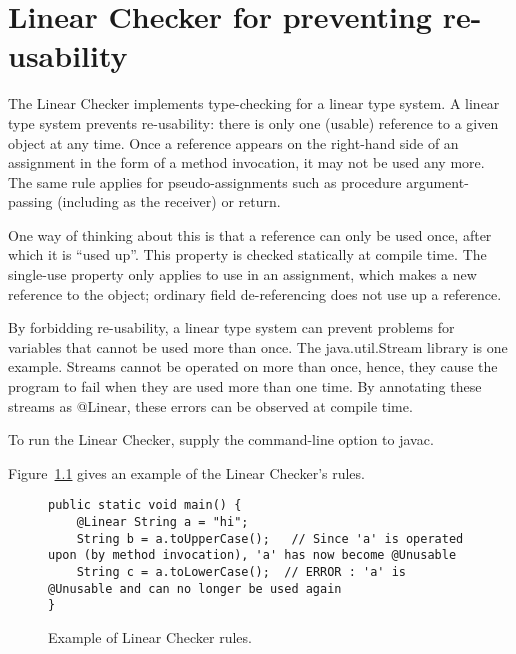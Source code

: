 \htmlhr
\chapter{Linear Checker for preventing re-usability\label{linear-checker}}

The Linear Checker implements type-checking for a linear type system.  A
linear type system prevents re-usability:  there is only one (usable) reference
to a given object at any time.  Once a reference appears on the right-hand
side of an assignment in the form of a method invocation, it may not be used any more.  The same rule applies
for pseudo-assignments such as procedure argument-passing (including as the
receiver) or return.

One way of thinking about this is that a reference can only be used once,
after which it is ``used up''.  This property is checked statically at
compile time.  The single-use property only applies to use in an
assignment, which makes a new reference to the object; ordinary field
de-referencing does not use up a reference.

By forbidding re-usability, a linear type system can prevent problems for variables that cannot be used more than once.
The java.util.Stream library is one example. Streams cannot be operated on more than once, hence, they cause the program
to fail when they are used more than one time. By annotating these streams as @Linear, these errors can be observed at
compile time.

To run the Linear Checker, supply the
command-line option to javac.

Figure~\ref{fig-linear-example} gives an example of the Linear Checker's rules.

\begin{figure}
\begin{smaller}
\begin{Verbatim}
public static void main() {
    @Linear String a = "hi";
    String b = a.toUpperCase();   // Since 'a' is operated upon (by method invocation), 'a' has now become @Unusable
    String c = a.toLowerCase();  // ERROR : 'a' is @Unusable and can no longer be used again
}
\end{Verbatim}
\end{smaller}
\caption{Example of Linear Checker rules.}
\label{fig-linear-example}
\end{figure}



